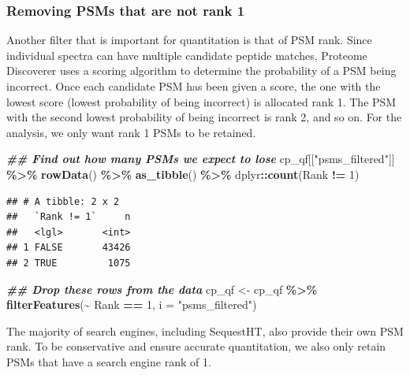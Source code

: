 \documentclass[9pt,a4paper,]{extarticle}
\newenvironment{Shaded}{\begin{snugshade}}{\end{snugshade}}
\newcommand{\AttributeTok}[1]{\textcolor[rgb]{0.13,0.29,0.53}{#1}}
\newcommand{\DecValTok}[1]{\textcolor[rgb]{0.00,0.00,0.81}{#1}}
\newcommand{\DocumentationTok}[1]{\textcolor[rgb]{0.56,0.35,0.01}{\textbf{\textit{#1}}}}
\newcommand{\FunctionTok}[1]{\textcolor[rgb]{0.13,0.29,0.53}{\textbf{#1}}}
\newcommand{\NormalTok}[1]{#1}
\newcommand{\OtherTok}[1]{\textcolor[rgb]{0.56,0.35,0.01}{#1}}
\newcommand{\SpecialCharTok}[1]{\textcolor[rgb]{0.81,0.36,0.00}{\textbf{#1}}}
\newcommand{\StringTok}[1]{\textcolor[rgb]{0.31,0.60,0.02}{#1}}
\begin{document}
\hypertarget{removing-psms-that-are-not-rank-1}{%
\subsubsection{Removing PSMs that are not rank 1}\label{removing-psms-that-are-not-rank-1}}

Another filter that is important for quantitation is that of PSM rank. Since
individual spectra can have multiple candidate peptide matches, Proteome
Discoverer uses a scoring algorithm to determine the probability of a PSM being
incorrect. Once each candidate PSM has been given a score, the one with the
lowest score (lowest probability of being incorrect) is allocated rank 1. The PSM
with the second lowest probability of being incorrect is rank 2, and so on. For
the analysis, we only want rank 1 PSMs to be retained.

\begin{Shaded}
\begin{Highlighting}[]
\DocumentationTok{\#\# Find out how many PSMs we expect to lose}
\NormalTok{cp\_qf[[}\StringTok{"psms\_filtered"}\NormalTok{]] }\SpecialCharTok{\%\textgreater{}\%} 
  \FunctionTok{rowData}\NormalTok{() }\SpecialCharTok{\%\textgreater{}\%} 
  \FunctionTok{as\_tibble}\NormalTok{() }\SpecialCharTok{\%\textgreater{}\%} 
\NormalTok{  dplyr}\SpecialCharTok{::}\FunctionTok{count}\NormalTok{(Rank }\SpecialCharTok{!=} \DecValTok{1}\NormalTok{)}
\end{Highlighting}
\end{Shaded}

\begin{verbatim}
## # A tibble: 2 x 2
##   `Rank != 1`     n
##   <lgl>       <int>
## 1 FALSE       43426
## 2 TRUE         1075
\end{verbatim}

\begin{Shaded}
\begin{Highlighting}[]
\DocumentationTok{\#\# Drop these rows from the data}
\NormalTok{cp\_qf }\OtherTok{\textless{}{-}}\NormalTok{ cp\_qf }\SpecialCharTok{\%\textgreater{}\%}
  \FunctionTok{filterFeatures}\NormalTok{(}\SpecialCharTok{\textasciitilde{}}\NormalTok{ Rank }\SpecialCharTok{==} \DecValTok{1}\NormalTok{,}
                 \AttributeTok{i =} \StringTok{"psms\_filtered"}\NormalTok{)}
\end{Highlighting}
\end{Shaded}

The majority of search engines, including SequestHT, also provide their own PSM
rank. To be conservative and ensure accurate quantitation, we also only retain
PSMs that have a search engine rank of 1.
\end{document}
